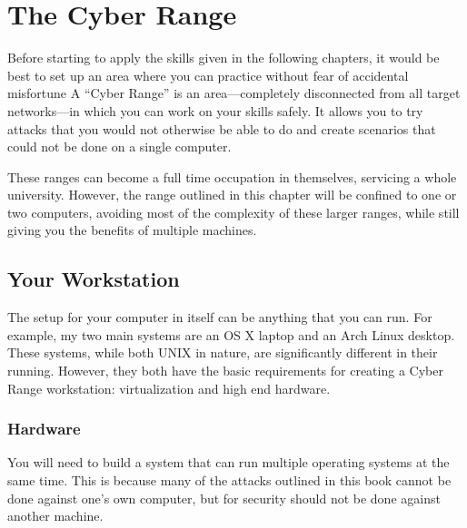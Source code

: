 \chapter{The Cyber Range}
	Before starting to apply the skills given in the following chapters, it would be best to set up an area where you can practice without fear of accidental misfortune\cite{pentestingLabs}
	A ``Cyber Range'' is an area---completely disconnected from all target networks---in which you can work on your skills safely.  
	It allows you to try attacks that you would not otherwise be able to do and create scenarios that could not be done on a single computer. 
	
	These ranges can become a full time occupation in themselves, servicing a whole university. 
	However, the range outlined in this chapter will be confined to one or two computers, avoiding most of the complexity of these larger ranges, 
	while still giving you the benefits of multiple machines. 
	\section{Your Workstation}
		The setup for your computer in itself can be anything that you can run. 
		For example, my two main systems are an OS X laptop and an Arch Linux desktop. 
		These systems, while both UNIX in nature, are significantly different in their running. 
		However, they both have the basic requirements for creating a Cyber Range workstation: virtualization and high end hardware. 

		\subsection{Hardware}
			You will need to build a system that can run multiple operating systems at the same time. 
			This is because many of the attacks outlined in this book cannot be done against one's own computer, 
			but for security should not be done against another machine. 

